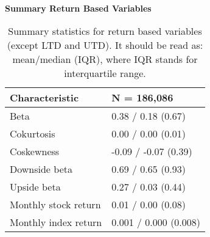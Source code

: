 \begin{table}[ht]
\caption{\\ \large{\textbf{Summary Return Based Variables}}}
\captionsetup{font = footnotesize, justification = justified, width = \linewidth}
\caption*{Summary statistics for return based variables
                        (except LTD and UTD). It should be read as:
                        mean/median (IQR), where IQR stands for interquartile range.}
\centering
\label{tab:sum_ret_variables}
\begin{tabular}[t]{ll}
\toprule
\textbf{Characteristic} & \textbf{N = 186,086}\\
\midrule
Beta & 0.38 / 0.18 (0.67)\\
Cokurtosis & 0.00 / 0.00 (0.01)\\
Coskewness & -0.09 / -0.07 (0.39)\\
Downside beta & 0.69 / 0.65 (0.93)\\
Upside beta & 0.27 / 0.03 (0.44)\\
\addlinespace
Monthly stock return & 0.01 / 0.00 (0.08)\\
Monthly index return & 0.001 / 0.000 (0.008)\\
\bottomrule
\end{tabular}
\end{table}
